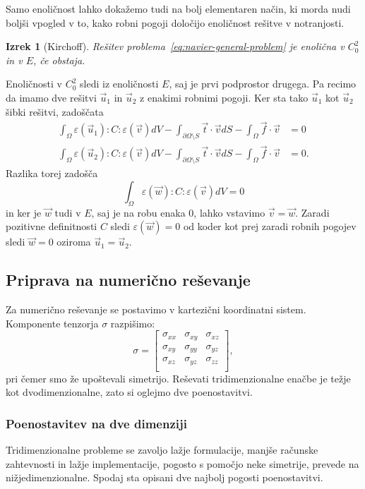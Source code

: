 \documentclass[a4paper,twoside]{article}
\theoremstyle{definition} %
\theoremstyle{plain} %
\newtheorem{izrek}[definicija]{Izrek}
\numberwithin{equation}{section}
\newcommand{\eps}{\varepsilon}
\newcommand{\vv}{\vec{v}}
\newcommand{\vt}{\vec{t}}
\newcommand{\vu}{\vec{u}}
\newcommand{\vw}{\vec{w}}
\newcommand{\vf}{\vec{f}}
\newcommand{\ts}{\sigma}
\begin{document}
Samo enoličnost lahko dokažemo tudi na bolj elementaren način, ki morda nudi boljši
vpogled v to, kako robni pogoji določijo enoličnost rešitve v notranjosti.
\begin{izrek}[Kirchoff]
  Rešitev problema~\ref{eq:navier-general-problem} je enolična v $C^2_0$ in v
  $E$, če obstaja.
\end{izrek}
\proof
Enoličnosti v $C_0^2$ sledi iz enoličnosti $E$, saj je prvi podprostor drugega.
Pa recimo da imamo dve rešitvi $\vu_1$ in $\vu_2$ z enakimi robnimi pogoji.
Ker sta tako $\vu_1$ kot $\vu_2$ šibki rešitvi, zadoščata
\begin{align*}
\int_{\Omega}\eps(\vu_1) : C : \eps(\vv) dV - \int_{\partial \Omega\setminus S} \vt\cdot \vv dS -
\int_{\Omega} \vf\cdot \vv &= 0 \\
\int_{\Omega}\eps(\vu_2) : C : \eps(\vv) dV - \int_{\partial \Omega\setminus S} \vt\cdot \vv dS -
\int_{\Omega} \vf\cdot \vv &= 0.
\end{align*}
Razlika torej zadošča \[ \int_{\Omega}\eps(\vw) : C : \eps(\vv) dV = 0 \] in ker
je $\vw$ tudi v $E$, saj je na robu enaka 0, lahko vstavimo $\vv = \vw$.
Zaradi pozitivne definitnosti $C$ sledi $\eps(\vw) = 0$ od koder kot prej zaradi
robnih pogojev sledi $\vw = 0$ oziroma $\vu_1 = \vu_2$.
\endproof

\subsection{Priprava na numerično reševanje}
Za numerično reševanje se postavimo v kartezični koordinatni sistem.
Komponente tenzorja $\ts$ razpišimo:
\[
  \ts =
  \begin{bmatrix}
    \ts_{xx} & \ts_{xy} & \ts_{xz} \\
    \ts_{xy} & \ts_{yy} & \ts_{yz} \\
    \ts_{xz} & \ts_{yz} & \ts_{zz} \\
  \end{bmatrix},
\]
pri čemer smo že upoštevali simetrijo. Reševati tridimenzionalne enačbe je težje
kot dvodimenzionalne, zato si oglejmo dve poenostavitvi.

\subsubsection{Poenostavitev na dve dimenziji}
Tridimenzionalne probleme se zavoljo lažje formulacije, manjše računske
zahtevnosti in lažje implementacije, pogosto s pomočjo neke simetrije, prevede na
nižjedimenzionalne. Spodaj sta opisani dve najbolj pogosti poenostavitvi.
\end{document}
